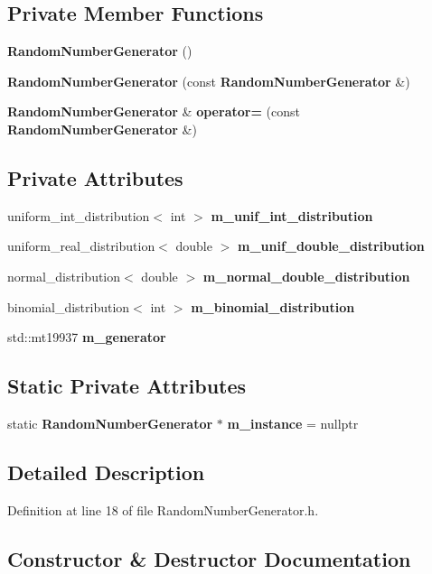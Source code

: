 \subsection*{Private Member Functions}
\begin{DoxyCompactItemize}
\item 
\textbf{ Random\+Number\+Generator} ()
\item 
\textbf{ Random\+Number\+Generator} (const \textbf{ Random\+Number\+Generator} \&)
\item 
\textbf{ Random\+Number\+Generator} \& \textbf{ operator=} (const \textbf{ Random\+Number\+Generator} \&)
\end{DoxyCompactItemize}
\subsection*{Private Attributes}
\begin{DoxyCompactItemize}
\item 
uniform\+\_\+int\+\_\+distribution$<$ int $>$ \textbf{ m\+\_\+unif\+\_\+int\+\_\+distribution}
\item 
uniform\+\_\+real\+\_\+distribution$<$ double $>$ \textbf{ m\+\_\+unif\+\_\+double\+\_\+distribution}
\item 
normal\+\_\+distribution$<$ double $>$ \textbf{ m\+\_\+normal\+\_\+double\+\_\+distribution}
\item 
binomial\+\_\+distribution$<$ int $>$ \textbf{ m\+\_\+binomial\+\_\+distribution}
\item 
std\+::mt19937 \textbf{ m\+\_\+generator}
\end{DoxyCompactItemize}
\subsection*{Static Private Attributes}
\begin{DoxyCompactItemize}
\item 
static \textbf{ Random\+Number\+Generator} $\ast$ \textbf{ m\+\_\+instance} = nullptr
\end{DoxyCompactItemize}


\subsection{Detailed Description}


Definition at line 18 of file Random\+Number\+Generator.\+h.



\subsection{Constructor \& Destructor Documentation}
\mbox{\label{class_random_number_generator_a8e7e711ea58f13f3ed95becbe33684e9}} 
